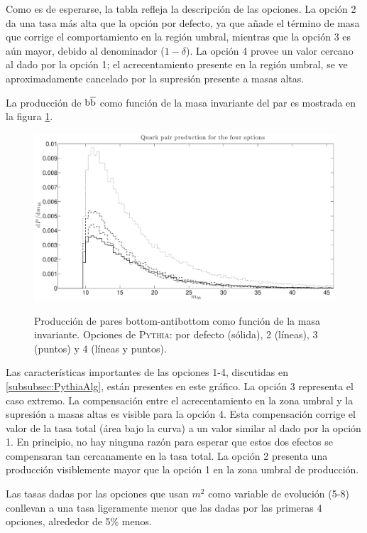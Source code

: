 \documentclass[a4paper,12pt]{article}
\begin{document}
Como es de esperarse, la tabla refleja la descripción de las opciones. La opción 2 da una tasa más alta que la opción por defecto, ya que añade el término de masa que corrige el comportamiento en la región umbral, mientras que la opción 3 es aún mayor, debido al denominador ($1-\delta$). La opción 4 provee un valor cercano al dado por la opción 1; el acrecentamiento presente en la región umbral, se ve aproximadamente cancelado por la supresión presente a masas altas.

La producción de ${\mathrm b}\overline{\mathrm b}$ como función de la masa invariante del par es mostrada en la figura \ref{fig:QMass}.


\begin{figure}[h]
\centering
\caption[Producción de pares de quarks bottom (cuatro opciones).]{Producción de pares bottom-antibottom como función de la masa invariante. Opciones de \textsc{Pythia}: por defecto (sólida), 2 (líneas), 3 (puntos) y 4 (líneas y puntos).}
\includegraphics[width=15cm]{QMass}
\label{fig:QMass}
\end{figure}



Las características importantes de las opciones 1-4, discutidas en \ref{subsubsec:PythiaAlg}, están presentes en este gráfico. La opción 3 representa el caso extremo. La compensación entre el acrecentamiento en la zona umbral y la supresión a masas altas es visible para la opción 4. Esta compensación corrige el valor de la tasa total (área bajo la curva) a un valor similar al dado por la opción 1. En principio, no hay ninguna razón para esperar que estos dos efectos se compensaran tan cercanamente en la tasa total. La opción 2 presenta una producción visiblemente mayor que la opción 1 en la zona umbral de producción.

Las tasas dadas por las opciones que usan $m^2$ como variable de evolución (5-8) conllevan a una tasa ligeramente menor que las dadas por las primeras 4 opciones, alrededor de 5\% menos.
\end{document}
